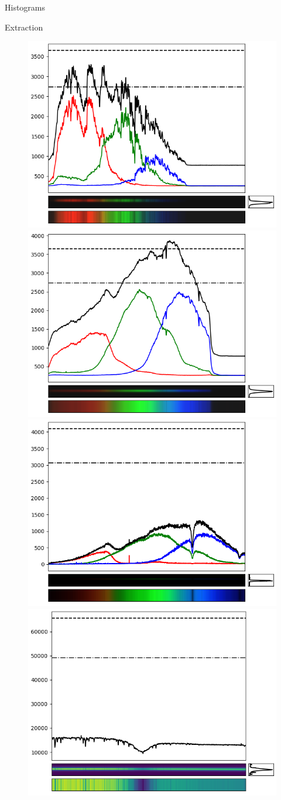 \documentclass[final,t]{beamer}
\begin{document}
\begin{frame}
\begin{columns}[t]
\begin{column}{.32\linewidth}
\begin{block}{Histograms}
\begin{figure}
					\end{figure}
					
				\end{block}
			
				
				\begin{block}{Extraction}
	
					\begin{figure}
						\includegraphics[width=0.49\columnwidth]{img/alpori_spec.png}
						\includegraphics[width=0.49\columnwidth]{img/betori_spec.png} \\
						\includegraphics[width=0.49\columnwidth]{img/alpcma_spec.png}
						\includegraphics[width=0.49\columnwidth]{img/alpleo_spec.png}
						

\end{figure}
\end{block}
\end{column}
\end{columns}
\end{frame}
\end{document}
